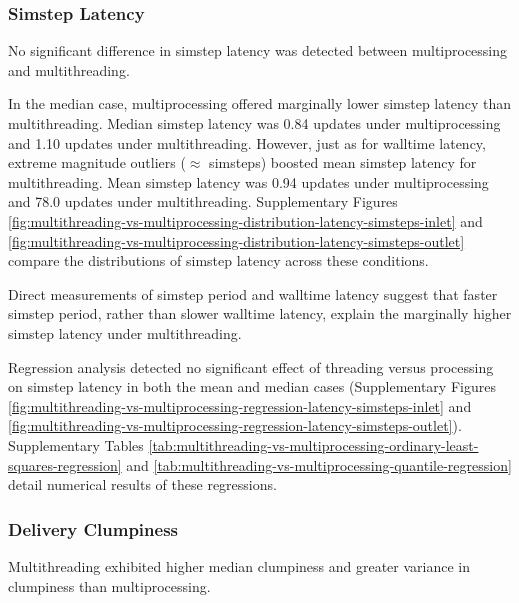 \subsubsection{Simstep Latency}

No significant difference in simstep latency was detected between multiprocessing and multithreading.

In the median case, multiprocessing offered marginally lower simstep latency than multithreading.
Median simstep latency was 0.84 updates under multiprocessing and 1.10 updates under multithreading.
However, just as for walltime latency, extreme magnitude outliers ($\approx$  simsteps) boosted mean simstep latency for multithreading.
Mean simstep latency was 0.94 updates under multiprocessing and 78.0 updates under multithreading.
Supplementary Figures \ref{fig:multithreading-vs-multiprocessing-distribution-latency-simsteps-inlet} and \ref{fig:multithreading-vs-multiprocessing-distribution-latency-simsteps-outlet} compare the distributions of simstep latency across these conditions.

Direct measurements of simstep period and walltime latency suggest that faster simstep period, rather than slower walltime latency, explain the marginally higher simstep latency under multithreading.

Regression analysis detected no significant effect of threading versus processing on simstep latency in both the mean and median cases (Supplementary Figures \ref{fig:multithreading-vs-multiprocessing-regression-latency-simsteps-inlet} and \ref{fig:multithreading-vs-multiprocessing-regression-latency-simsteps-outlet}).
Supplementary Tables \ref{tab:multithreading-vs-multiprocessing-ordinary-least-squares-regression} and \ref{tab:multithreading-vs-multiprocessing-quantile-regression} detail numerical results of these regressions.

\subsubsection{Delivery Clumpiness}

Multithreading exhibited higher median clumpiness and greater variance in clumpiness than multiprocessing.

